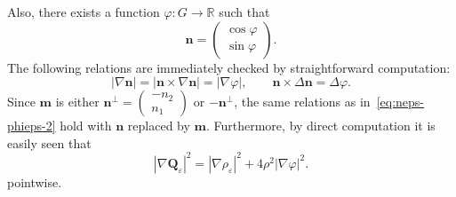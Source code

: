 \documentclass[a4paper, 11pt, twoside, leqno]{article}
\theoremstyle{definition}              %
\theoremstyle{remark}                  %
\newcommand{\abs}[1]{\left| #1 \right|}                             %
\newcommand{\R}{\mathbb{R}}
\newcommand{\Q}{\mathbf{Q}}
\newcommand{\n}{\mathbf{n}}
\newcommand{\m}{\mathbf{m}}
\newcommand{\eps}{\varepsilon}
\begin{document}
Also, there exists a function $\varphi : G \to \R$ such that
\begin{equation}\label{eq:neps-phieps-1}
    \n  = 
    \begin{pmatrix}
        \cos\varphi \\ 
        \sin\varphi
    \end{pmatrix}.
\end{equation}
The following relations are immediately checked by straightforward computation:
\begin{equation}\label{eq:neps-phieps-2}
    \abs{\nabla \n} = \abs{\n\times \nabla \n} = \abs{\nabla \varphi}, \qquad 
    \n \times \Delta \n = \Delta \varphi.
\end{equation}
Since $\m$ is either $\n^\perp = \begin{pmatrix} -n_2 \\ n_1 \end{pmatrix}$ or $-\n^\perp$, the same relations as in~\eqref{eq:neps-phieps-2} hold with $\n$ replaced by $\m$. Furthermore, by direct computation it is easily seen that 
\begin{equation}\label{eq:dec-grad-Q-square}
	\abs{\nabla \Q_\eps}^2 = \abs{\nabla \rho_\eps}^2 + 4 \rho^2 \abs{\nabla \varphi}^2.
\end{equation}
pointwise.
\end{document}
